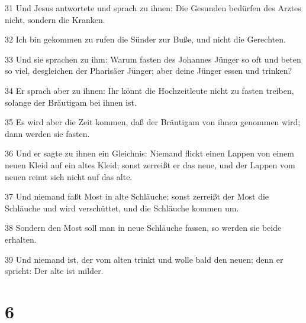 \par 31 Und Jesus antwortete und sprach zu ihnen: Die Gesunden bedürfen des Arztes nicht, sondern die Kranken.
\par 32 Ich bin gekommen zu rufen die Sünder zur Buße, und nicht die Gerechten.
\par 33 Und sie sprachen zu ihm: Warum fasten des Johannes Jünger so oft und beten so viel, desgleichen der Pharisäer Jünger; aber deine Jünger essen und trinken?
\par 34 Er sprach aber zu ihnen: Ihr könnt die Hochzeitleute nicht zu fasten treiben, solange der Bräutigam bei ihnen ist.
\par 35 Es wird aber die Zeit kommen, daß der Bräutigam von ihnen genommen wird; dann werden sie fasten.
\par 36 Und er sagte zu ihnen ein Gleichnis: Niemand flickt einen Lappen von einem neuen Kleid auf ein altes Kleid; sonst zerreißt er das neue, und der Lappen vom neuen reimt sich nicht auf das alte.
\par 37 Und niemand faßt Most in alte Schläuche; sonst zerreißt der Most die Schläuche und wird verschüttet, und die Schläuche kommen um.
\par 38 Sondern den Most soll man in neue Schläuche fassen, so werden sie beide erhalten.
\par 39 Und niemand ist, der vom alten trinkt und wolle bald den neuen; denn er spricht: Der alte ist milder.

\chapter{6}

